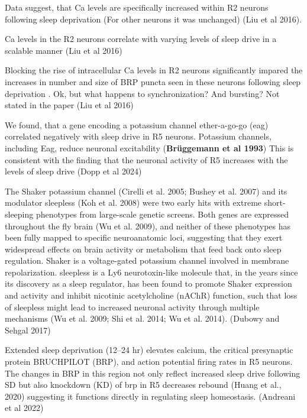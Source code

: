    Data suggest, that Ca levels are specifically increased within R2 neurons following sleep deprivation (For other neurons
    it was unchanged) \cite{liuSleepDriveEncoded2016} (Liu et al 2016).

    Ca levels in the R2 neurons correlate with varying levels of sleep drive in a scalable manner \cite{liuSleepDriveEncoded2016}
    (Liu et al 2016)

    Blocking the rise of intracellular Ca levels in R2 neurons significantly impared the increases in number and size of BRP puncta
    seen in these neurons following sleep deprivation \cite{liuSleepDriveEncoded2016}.
    Ok, but what happens to synchronization? And bursting? Not stated in the paper
    (Liu et al 2016)

    We found, that a gene encoding a potassium channel ether-a-go-go (eag) correlated negatively with sleep drive in R5 neurons.
    Potassium channels, including Eag, reduce neuronal excitability (\textbf{Brüggemann et al 1993})
    This is consistent with the finding that the neuronal activity of R5 increases with the levels of sleep drive
    (Dopp et al 2024)

    The Shaker potassium channel (Cirelli et al. 2005; Bushey et al. 2007) and its modulator 
    sleepless (Koh et al. 2008) were two early hits with extreme short-sleeping phenotypes from 
    large-scale genetic screens. Both genes are expressed throughout the fly brain (Wu et al. 2009),
    and neither of these phenotypes has been fully mapped to specific neuroanatomic loci, suggesting
    that they exert widespread effects on brain activity or metabolism that feed back onto sleep 
    regulation. Shaker is a voltage-gated potassium channel involved in membrane repolarization.
    sleepless is a Ly6 neurotoxin-like molecule that, in the years since its discovery as a 
    sleep regulator, has been found to promote Shaker expression and activity and inhibit 
    nicotinic acetylcholine (nAChR) function, such that loss of sleepless might lead to 
    increased neuronal activity through multiple mechanisms 
    (Wu et al. 2009; Shi et al. 2014; Wu et al. 2014).
    \cite{dubowyCircadianRhythmsSleep2017} (Dubowy and Sehgal 2017)

    Extended sleep deprivation (12–24 hr) elevates calcium, the critical presynaptic protein BRUCHPILOT (BRP), and action potential firing rates in R5 neurons. The changes in BRP in this region not only reflect increased sleep drive following SD but also knockdown (KD) of brp in R5 decreases rebound (Huang et al., 2020) suggesting it functions directly in regulating sleep homeostasis.
    \cite{andreaniCircadianProgrammingEllipsoid2022} (Andreani et al 2022)

